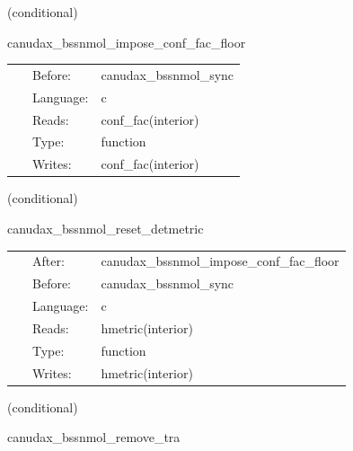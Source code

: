 \vspace{5mm}

   (conditional) 

\hspace{5mm} canudax\_bssnmol\_impose\_conf\_fac\_floor 

\hspace{5mm}{\it make sure conformal factor does not drop below specified value } 


\hspace{5mm}

 \begin{tabular*}{160mm}{cll} 
~ & Before:  & canudax\_bssnmol\_sync \\ 
~ & Language:  & c \\ 
~ & Reads:  & conf\_fac(interior) \\ 
~ & Type:  & function \\ 
~ & Writes:  & conf\_fac(interior) \\ 
\end{tabular*} 


\vspace{5mm}

   (conditional) 

\hspace{5mm} canudax\_bssnmol\_reset\_detmetric 

\hspace{5mm}{\it reset dethh = 1 } 


\hspace{5mm}

 \begin{tabular*}{160mm}{cll} 
~ & After:  & canudax\_bssnmol\_impose\_conf\_fac\_floor \\ 
~ & Before:  & canudax\_bssnmol\_sync \\ 
~ & Language:  & c \\ 
~ & Reads:  & hmetric(interior) \\ 
~ & Type:  & function \\ 
~ & Writes:  & hmetric(interior) \\ 
\end{tabular*} 


\vspace{5mm}

   (conditional) 

\hspace{5mm} canudax\_bssnmol\_remove\_tra 

